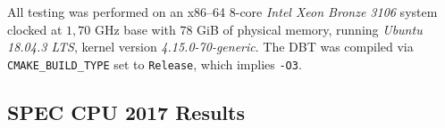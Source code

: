 All testing was performed on an x86--64 8-core \textit{Intel Xeon Bronze 3106} system clocked at $1,70$ GHz base with $78$ GiB of physical memory, running \textit{Ubuntu 18.04.3 LTS}, kernel version \textit{4.15.0-70-generic}.
The DBT was compiled via \texttt{CMAKE\_BUILD\_TYPE} set to \texttt{Release}, which implies \texttt{-O3}.

\subsection{SPEC CPU 2017 Results}


\nativetable
{}\dbttable
{}\dbttable
{}\dbttable

\pgfplotstablesort[sort key = ratio, sort cmp=float >]\sorteddbttable{\dbttable}

